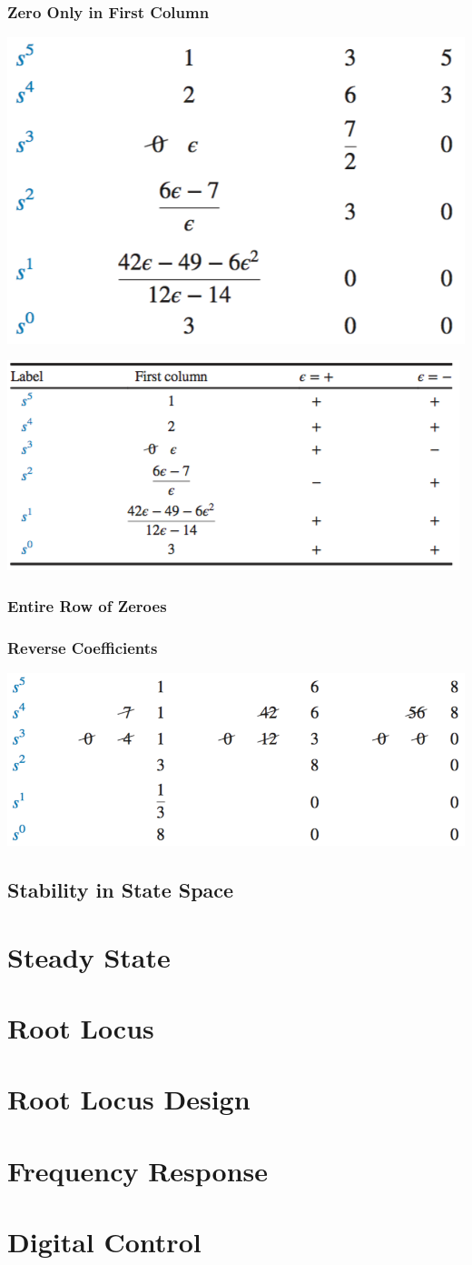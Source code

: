 \documentclass[11pt]{article}
\begin{document}
    \subsubsection{Zero Only in First Column}
    \begin{center}
        \includegraphics[width = 300 px]{img/routh-e}        
    \end{center}
    \begin{center}
        \includegraphics[width = 300 px]{img/routh-e2}        
    \end{center}
    \subsubsection{Entire Row of Zeroes}
    \subsubsection{Reverse Coefficients}
    \begin{center}
        \includegraphics[width = 300 px]{img/routh-roz}        
    \end{center}
    \subsection{Stability in State Space}
    \section{Steady State}
    \section{Root Locus}
    \section{Root Locus Design}
    \section{Frequency Response}
    \section{Digital Control}

    
\end{document}
